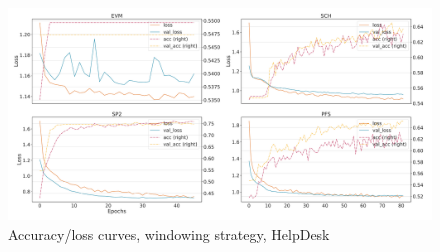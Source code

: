 \begin{figure}[!htb]
    \centering
    \includegraphics[width=\textwidth]{gfx/helpdesk/windowed_loss_acc_curve.pdf}
    \caption{Accuracy/loss curves, windowing strategy, HelpDesk}
\end{figure}
\FloatBarrier

